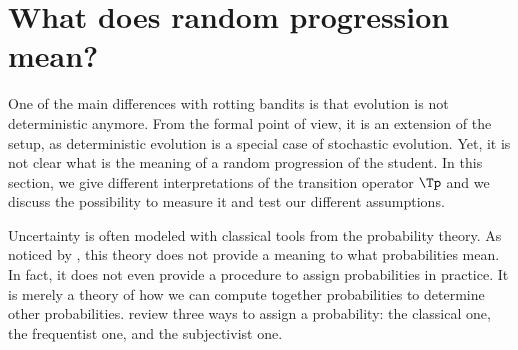 \section{What does random progression mean? }
One of the main differences with rotting bandits is that evolution is not deterministic anymore. From the formal point of view, it is an extension of the setup, as deterministic evolution is a special case of stochastic evolution. Yet, it is not clear what is the meaning of a random progression of the student. In this section, we give different interpretations of the transition operator $\Tp$ and we discuss the possibility to measure it and test our different assumptions. 

Uncertainty is often modeled with classical tools from the probability theory. As noticed by \citet{lavenant2019how}, this theory does not provide a meaning to what probabilities mean. In fact, it does not even provide a procedure to assign probabilities in practice. It is merely a theory of how we can compute together probabilities to determine other probabilities. \citet{lavenant2019how} review three ways to assign a probability: the classical one, the frequentist one, and the subjectivist one. 

